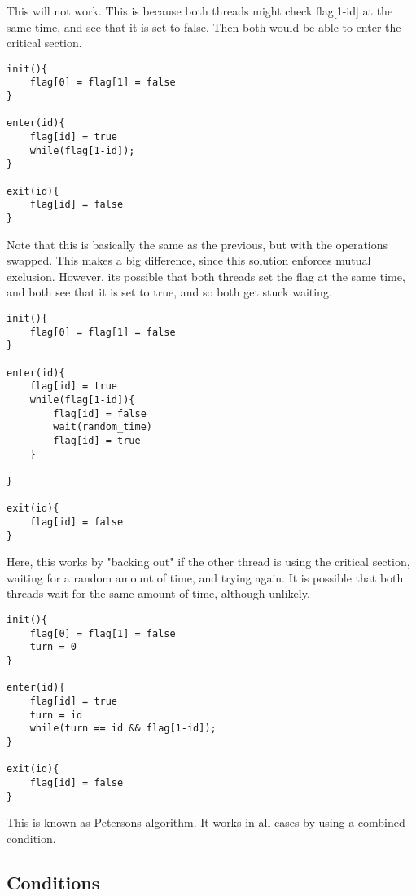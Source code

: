 \documentclass[12pt]{article}
\theoremstyle{definition}
\begin{document}
This will not work. This is because both threads might check flag[1-id] at the same time, and see that it is set to false. Then both would be able to enter the critical section.
\\ \linebreak
\begin{lstlisting}
init(){
	flag[0] = flag[1] = false
}

enter(id){
	flag[id] = true
	while(flag[1-id]);
}

exit(id){
	flag[id] = false
}
\end{lstlisting}
Note that this is basically the same as the previous, but with the operations swapped. This makes a big difference, since this solution enforces mutual exclusion. However, its possible that both threads set the flag at the same time, and both see that it is set to true, and so both get stuck waiting.
\\ \linebreak
\begin{lstlisting}
init(){
	flag[0] = flag[1] = false
}

enter(id){
	flag[id] = true
	while(flag[1-id]){
		flag[id] = false
		wait(random_time)
		flag[id] = true
	}
	
}

exit(id){
	flag[id] = false
}
\end{lstlisting}
Here, this works by "backing out" if the other thread is using the critical section, waiting for a random amount of time, and trying again. It is possible that both threads wait for the same amount of time, although unlikely.

\begin{lstlisting}
init(){
	flag[0] = flag[1] = false
	turn = 0
}

enter(id){
	flag[id] = true
	turn = id
	while(turn == id && flag[1-id]);
}

exit(id){
	flag[id] = false
}

\end{lstlisting}
This is known as Petersons algorithm. It works in all cases by using a combined condition. 

\subsection{Conditions}
\end{document}
